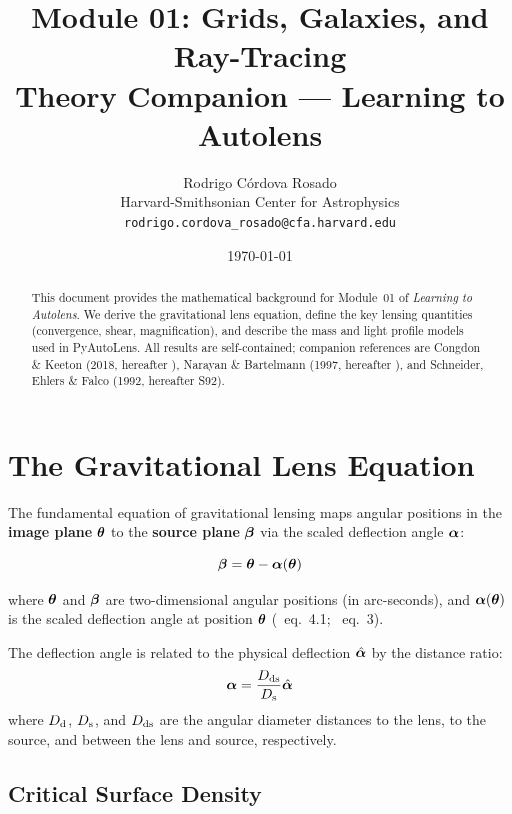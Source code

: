 \documentclass[11pt, letterpaper]{article}
\title{\textbf{Module 01: Grids, Galaxies, and Ray-Tracing}\\[0.5em]
\large Theory Companion — Learning to Autolens}
\author{Rodrigo C\'ordova Rosado\\
\small Harvard-Smithsonian Center for Astrophysics\\
\small \texttt{rodrigo.cordova\_rosado@cfa.harvard.edu}}
\date{\today}
\begin{document}
\maketitle

\begin{abstract}
This document provides the mathematical background for Module~01 of
\emph{Learning to Autolens}. We derive the gravitational lens equation,
define the key lensing quantities (convergence, shear, magnification),
and describe the mass and light profile models used in PyAutoLens.
All results are self-contained; companion references are
Congdon \& Keeton (2018, hereafter \CK), Narayan \& Bartelmann (1997,
hereafter \NB), and Schneider, Ehlers \& Falco (1992, hereafter S92).
\end{abstract}

\tableofcontents
\newpage

\section{The Gravitational Lens Equation}
\label{sec:lens-equation}

The fundamental equation of gravitational lensing maps angular positions
in the \textbf{image plane} $\bm{\theta}$ to the \textbf{source plane}
$\bm{\beta}$ via the scaled deflection angle $\bm{\alpha}$:

\begin{keyresult}
\begin{equation}
\bm{\beta} = \bm{\theta} - \bm{\alpha}(\bm{\theta})
\label{eq:lens-equation}
\end{equation}
\end{keyresult}

\noindent where $\bm{\theta}$ and $\bm{\beta}$ are two-dimensional angular
positions (in arc-seconds), and $\bm{\alpha}(\bm{\theta})$ is the scaled
deflection angle at position $\bm{\theta}$ (\CK\ eq.~4.1; \NB\ eq.~3).

The deflection angle is related to the physical deflection
$\hat{\bm{\alpha}}$ by the distance ratio:
\begin{equation}
\bm{\alpha} = \frac{D_{\rm ds}}{D_{\rm s}} \hat{\bm{\alpha}}
\label{eq:scaled-deflection}
\end{equation}
where $D_{\rm d}$, $D_{\rm s}$, and $D_{\rm ds}$ are the angular diameter distances to
the lens, to the source, and between the lens and source, respectively.

\subsection{Critical Surface Density}
\end{document}
